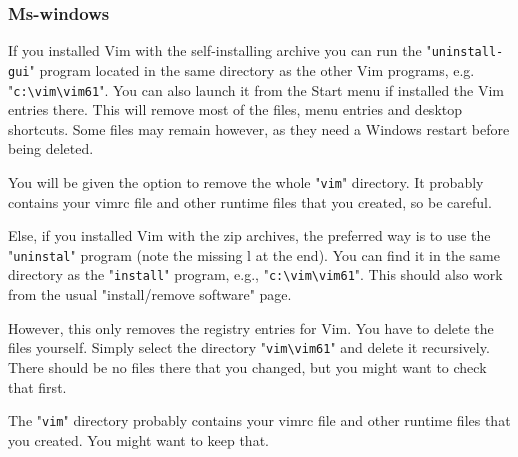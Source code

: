 \subsubsection{Ms-windows}
If you installed Vim with the self-installing archive you can run the "\texttt{uninstall-gui}" program located in the same directory as the other Vim programs, e.g. "\texttt{c:\textbackslash{}vim\textbackslash{}vim61}".
You can also launch it from the Start menu if installed the Vim entries there.
This will remove most of the files, menu entries and desktop shortcuts.
Some files may remain however, as they need a Windows restart before being deleted.

You will be given the option to remove the whole "\texttt{vim}" directory.
It probably contains your vimrc file and other runtime files that you created, so be careful.

Else, if you installed Vim with the zip archives, the preferred way is to use the "\texttt{uninstal}" program (note the missing l at the end).
You can find it in the same directory as the "\texttt{install}" program, e.g., "\texttt{c:\textbackslash{}vim\textbackslash{}vim61}".
This should also work from the usual "install/remove software" page.

However, this only removes the registry entries for Vim.
You have to delete the files yourself.
Simply select the directory "\texttt{vim\textbackslash{}vim61}" and delete it recursively.
There should be no files there that you changed, but you might want to check that first.

The "\texttt{vim}" directory probably contains your vimrc file and other runtime files that you created.
You might want to keep that.
\clearpage
